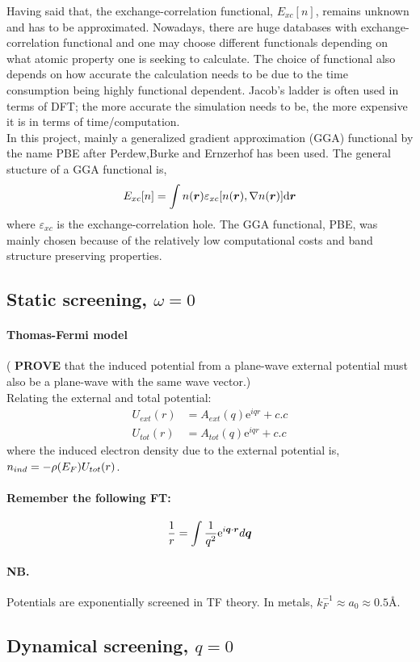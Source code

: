 Having said that, the exchange-correlation functional, $E_{xc}[n]$, remains unknown and has to be approximated. Nowadays, there are huge databases with exchange-correlation functional and one may choose different functionals depending on what atomic property one is seeking to calculate. The choice of functional also depends on how accurate the calculation needs to be due to the time consumption being highly functional dependent. Jacob's ladder is often used in terms of DFT; the more accurate the simulation needs to be, the more expensive it is in terms of time/computation. \\
In this project, mainly a generalized gradient approximation (GGA) functional by the name PBE after Perdew,Burke and Ernzerhof has been used. The general stucture of a GGA functional is,
\begin{equation}
    E_{xc}[n]= \int n \qty(\vb{r}) \varepsilon_{xc} \comm{n\qty(\vb{r})}{ \nabla n \qty(\vb{r})} \dd \vb{r}
\end{equation}
where $\varepsilon_{xc}$ is the exchange-correlation hole. The GGA functional, PBE, was mainly chosen because of the relatively low computational costs and band structure preserving properties.

\subsection{Static screening, $\omega = 0$}
\paragraph{Thomas-Fermi model} (
\textbf{PROVE} that the induced potential from a plane-wave external potential must also be a plane-wave with the same wave vector.)\\
Relating the external and total potential:
\begin{equation}
\begin{split}
    U_{ext}(r) &= A_{ext}(q) \mathrm{e}^{iqr} + c.c \\
    U_{tot}(r) &= A_{tot}(q) \mathrm{e}^{iqr} + c.c
\end{split}
\end{equation}
where the induced electron density due to the external potential is, $n_{ind} = - \rho\qty(E_F) U_{tot}(r)$.

\paragraph{Remember the following FT:}
\begin{equation}
    \dfrac{1}{r}= \int  \dfrac{1}{q^2} \mathrm{e}^{i \bm{q}\cdot \bm{r}} d\bm{q}
\end{equation}
\paragraph{NB.} Potentials are exponentially screened in TF theory. In metals, $k_F^{-1} \approx a_0 \approx 0.5$Å. 

\subsection{Dynamical screening, $q =  0$}


